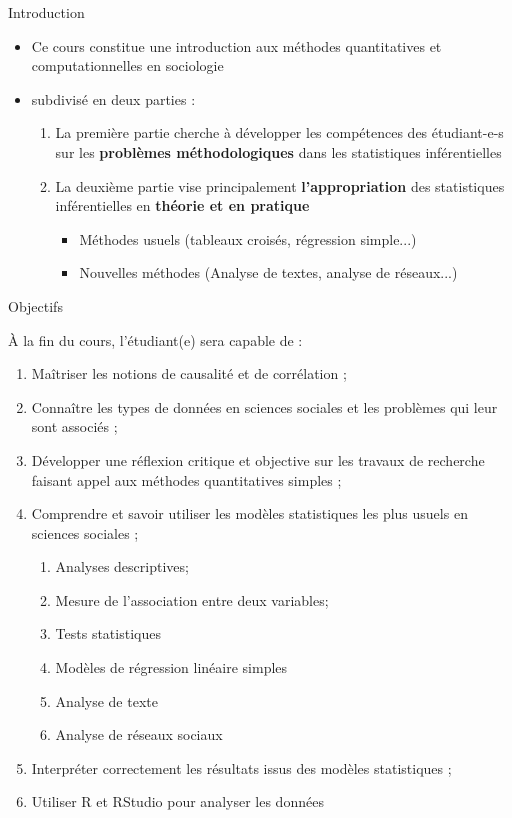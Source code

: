 \documentclass[xcolor=table]{beamer}
\begin{document}
\begin{frame}{Introduction}

\begin{itemize}
  \item Ce cours constitue une introduction aux méthodes quantitatives et computationnelles en sociologie
  \item subdivisé en deux parties :
  \begin{enumerate}
  	\item La première partie cherche à développer les compétences des étudiant-e-s sur les \textbf{problèmes méthodologiques} dans les statistiques inférentielles
    \item La deuxième partie vise principalement \textbf{l’appropriation} des statistiques inférentielles en \textbf{théorie et en pratique} 
    \begin{itemize}
    	\item Méthodes usuels (tableaux croisés, régression simple...)
        \item Nouvelles méthodes (Analyse de textes, analyse de réseaux...)
    \end{itemize}
  
  \end{enumerate}
\end{itemize}
\vskip 1cm

\end{frame}


\begin{frame}{Objectifs}

À la fin du cours, l'étudiant(e) sera capable de :

\begin{enumerate}
  \item Maîtriser les notions de causalité et de corrélation ;
  \item Connaître les types de données en sciences sociales et les problèmes qui leur sont associés ;
  \item Développer une réflexion critique et objective sur les travaux de recherche faisant appel aux méthodes quantitatives simples ;
  \item Comprendre et savoir utiliser les modèles statistiques les plus usuels en sciences sociales ;
  \begin{enumerate}[i]
  	\item Analyses descriptives;
    \item Mesure de l’association entre deux variables;
    \item Tests statistiques
    \item Modèles de régression linéaire simples
    \item Analyse de texte
    \item Analyse de réseaux sociaux 
  \end{enumerate}
  \item Interpréter correctement les résultats issus des modèles statistiques ;
  \item Utiliser R et RStudio pour analyser les données
\end{enumerate}
\vskip 1cm

\end{frame}
\end{document}
